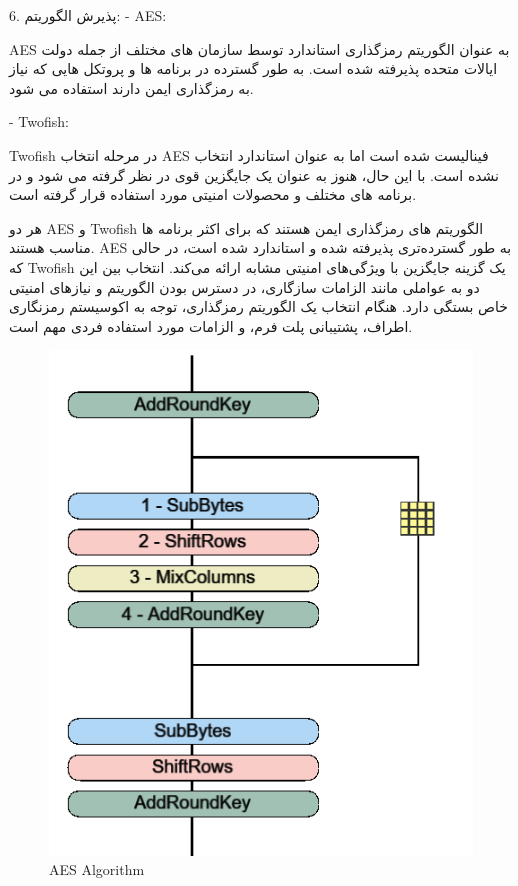 \begin{boxB}
6. پذیرش الگوریتم:
    - AES:
    
    AES به عنوان الگوریتم رمزگذاری استاندارد توسط سازمان های مختلف از جمله دولت ایالات متحده پذیرفته شده است. به طور گسترده در برنامه ها و پروتکل هایی که نیاز به رمزگذاری ایمن دارند استفاده می شود.
    
    - Twofish:
    
    Twofish در مرحله انتخاب AES فینالیست شده است اما به عنوان استاندارد انتخاب نشده است. با این حال، هنوز به عنوان یک جایگزین قوی در نظر گرفته می شود و در برنامه های مختلف و محصولات امنیتی مورد استفاده قرار گرفته است.


هر دو AES و Twofish الگوریتم های رمزگذاری ایمن هستند که برای اکثر برنامه ها مناسب هستند. AES به طور گسترده‌تری پذیرفته شده و استاندارد شده است، در حالی که Twofish یک گزینه جایگزین با ویژگی‌های امنیتی مشابه ارائه می‌کند. انتخاب بین این دو به عواملی مانند الزامات سازگاری، در دسترس بودن الگوریتم و نیازهای امنیتی خاص بستگی دارد. هنگام انتخاب یک الگوریتم رمزگذاری، توجه به اکوسیستم رمزنگاری اطراف، پشتیبانی پلت فرم، و الزامات مورد استفاده فردی مهم است.
\end{boxB}

\begin{figure}
    \centering
    \includegraphics{Final/images/AES.png}
    \caption{AES Algorithm}
    \label{fig:enter-label}
\end{figure}